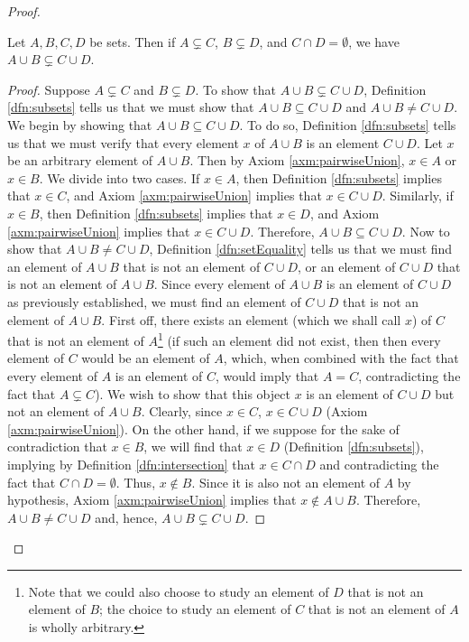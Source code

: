 \documentclass[../main.tex]{subfiles}
\begin{document}
\begin{enumerate}[ref={\thesection.\arabic*}]
\begin{proof}
\begin{lem}
            Let $A,B,C,D$ be sets. Then if $A\subsetneq C$, $B\subsetneq D$, and $C\cap D=\emptyset$, we have $A\cup B\subsetneq C\cup D$.
            \begin{proof}
                Suppose $A\subsetneq C$ and $B\subsetneq D$. To show that $A\cup B\subsetneq C\cup D$, Definition \ref{dfn:subsets} tells us that we must show that $A\cup B\subseteq C\cup D$ and $A\cup B\neq C\cup D$. We begin by showing that $A\cup B\subseteq C\cup D$. To do so, Definition \ref{dfn:subsets} tells us that we must verify that every element $x$ of $A\cup B$ is an element $C\cup D$. Let $x$ be an arbitrary element of $A\cup B$. Then by Axiom \ref{axm:pairwiseUnion}, $x\in A$ or $x\in B$. We divide into two cases. If $x\in A$, then Definition \ref{dfn:subsets} implies that $x\in C$, and Axiom \ref{axm:pairwiseUnion} implies that $x\in C\cup D$. Similarly, if $x\in B$, then Definition \ref{dfn:subsets} implies that $x\in D$, and Axiom \ref{axm:pairwiseUnion} implies that $x\in C\cup D$. Therefore, $A\cup B\subseteq C\cup D$. Now to show that $A\cup B\neq C\cup D$, Definition \ref{dfn:setEquality} tells us that we must find an element of $A\cup B$ that is not an element of $C\cup D$, or an element of $C\cup D$ that is not an element of $A\cup B$. Since every element of $A\cup B$ is an element of $C\cup D$ as previously established, we must find an element of $C\cup D$ that is not an element of $A\cup B$. First off, there exists an element (which we shall call $x$) of $C$ that is not an element of $A$\footnote{Note that we could also choose to study an element of $D$ that is not an element of $B$; the choice to study an element of $C$ that is not an element of $A$ is wholly arbitrary.} (if such an element did not exist, then then every element of $C$ would be an element of $A$, which, when combined with the fact that every element of $A$ is an element of $C$, would imply that $A=C$, contradicting the fact that $A\subsetneq C$). We wish to show that this object $x$ is an element of $C\cup D$ but not an element of $A\cup B$. Clearly, since $x\in C$, $x\in C\cup D$ (Axiom \ref{axm:pairwiseUnion}). On the other hand, if we suppose for the sake of contradiction that $x\in B$, we will find that $x\in D$ (Definition \ref{dfn:subsets}), implying by Definition \ref{dfn:intersection} that $x\in C\cap D$ and contradicting the fact that $C\cap D=\emptyset$. Thus, $x\notin B$. Since it is also not an element of $A$ by hypothesis, Axiom \ref{axm:pairwiseUnion} implies that $x\notin A\cup B$. Therefore, $A\cup B\neq C\cup D$ and, hence, $A\cup B\subsetneq C\cup D$.

\end{proof}
\end{lem}
\end{proof}
\end{enumerate}
\end{document}
